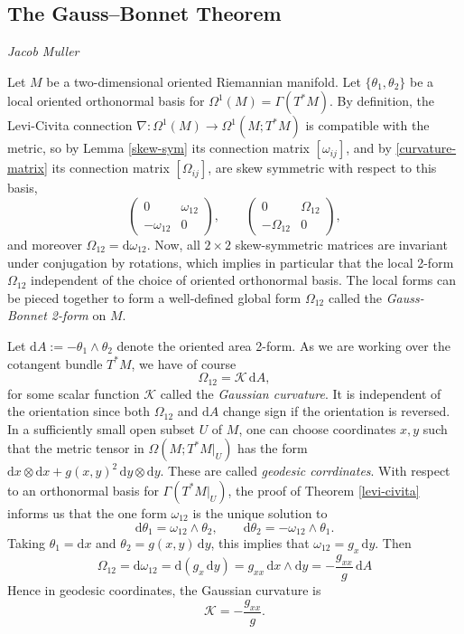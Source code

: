 \documentclass[a4paper,openany]{scrbook}
\newcommand{\chapterauthor}[1]{\hfill\emph{#1}\par\noindent}
\newcommand{\ud}{\mathrm{d}}
\begin{document}
\subsection{The Gauss--Bonnet Theorem}
\chapterauthor{Jacob Muller}

Let $M$ be a two-dimensional oriented Riemannian manifold. Let $\{\theta_1,\theta_2\}$ be a local oriented orthonormal basis for $\Omega^1(M)=\Gamma(T^*M)$. By definition, the 
Levi-Civita connection $\nabla:\Omega^1(M)\to\Omega^1(M;T^*M)$ is compatible with the metric, so by Lemma \ref{skew-sym} its connection matrix $[\omega_{ij}]$, and by \eqref{curvature-matrix} its connection matrix $[\Omega_{ij}]$, are skew symmetric with respect to this basis,
\begin{equation*}
\begin{pmatrix}0&\omega_{12}\\-\omega_{12}&0\end{pmatrix},\qquad\begin{pmatrix}0&\Omega_{12}\\-\Omega_{12}&0\end{pmatrix},
\end{equation*}
and moreover $\Omega_{12}=\ud\omega_{12}$. Now, all $2\times2$ skew-symmetric matrices are invariant under conjugation by rotations, which implies in particular that the local 2-form $\Omega_{12}$ independent of the choice of oriented orthonormal basis. The local forms can be pieced together to form a well-defined global form $\Omega_{12}$ called the \emph{Gauss-Bonnet 2-form} on $M$.

Let $\ud A:=-\theta_1\wedge\theta_2$ denote the oriented area 2-form. As we are working over the cotangent bundle $T^*M$, we have of course
\begin{equation*}
\Omega_{12}=\mathcal{K}\,\ud A,
\end{equation*}
for some scalar function $\mathcal{K}$ called the \emph{Gaussian curvature}. It is independent of the orientation since both $\Omega_{12}$ and $\ud A$ change sign if the orientation is reversed. In a sufficiently small open subset $U$ of $M$, one can choose coordinates $x,y$ such that the metric tensor in $\Omega(M;T^*M|_U)$ has the form $\ud x\otimes\ud x+g(x,y)^2\,\ud y\otimes\ud y$. These are called \emph{geodesic corrdinates}. With respect to an orthonormal basis for $\Gamma(T^*M|_U)$, the proof of Theorem \ref{levi-civita} informs us that the one form $\omega_{12}$ is the unique solution to
\begin{equation*}
\ud\theta_1=\omega_{12}\wedge\theta_2,\qquad\ud\theta_2=-\omega_{12}\wedge\theta_1.
\end{equation*}
Taking $\theta_1=\ud x$ and $\theta_2=g(x,y)\,\ud y$, this implies that $\omega_{12}=g_x\,\ud y$. Then
\begin{equation*}
\Omega_{12}=\ud\omega_{12}=\ud(g_x\,\ud y)=g_{xx}\,\ud x\wedge\ud y=-\frac{g_{xx}}{g}\,\ud A
\end{equation*}
Hence in geodesic coordinates, the Gaussian curvature is
\begin{equation*}
\mathcal{K}=-\frac{g_{xx}}{g}.
\end{equation*}
\end{document}
